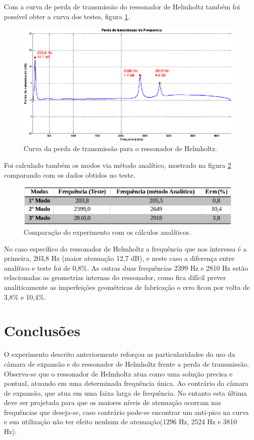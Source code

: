 \newpage
Com a curva de perda de transmissão do ressonador de Helmholtz também foi possível obter a curva dos testes, figura \ref{resultado_2}.

\begin{figure}[h]
\centering
\includegraphics[scale=0.52]{resultado_2.eps}
\caption{Curva da perda de transmissão para o ressonador de Helmholtz.}
\label{resultado_2}
\end{figure}

Foi calculado também os modos via método analítico, mostrado na figura \ref{resultado_3} comparando com os dados obtidos no teste.

\begin{figure}[h]
\centering
\includegraphics[scale=0.52]{resultado_3.eps}
\caption{Comparação do experimento com os cálculos analíticos.}
\label{resultado_3}
\end{figure}

No caso específico do ressonador de Helmholtz a frequência que nos interessa é a primeira, 203,8 Hz (maior atenuação 12,7 dB), e neste caso a diferença entre analítico e teste foi de 0,8\%. As outras duas frequências 2399 Hz e 2810 Hz estão relacionadas as geometrias internas do ressonador, como fica difícil prever analiticamente as imperfeições geométricas de fabricação o erro ficou por volta de 3,8\% e 10,4\%.

\chapter{Conclusões}\label{conclusoes}

O experimento descrito anteriormente reforçou as particularidades do uso da câmara de expansão e do ressonador de Helmholtz frente a perda de transmissão. Observa-se que o ressonador de Helmholtz atua como uma solução precisa e pontual, atuando em uma determinada frequência única. Ao contrário da câmara de expansão, que atua em uma faixa larga de frequência. No entanto esta última deve ser projetada para que os maiores níveis de atenuação ocorram nas frequências que deseja-se, caso contrário pode-se encontrar um anti-pico na curva e sua utilização não ter efeito nenhum de atenuação(1296 Hz, 2524 Hz e 3810 Hz).